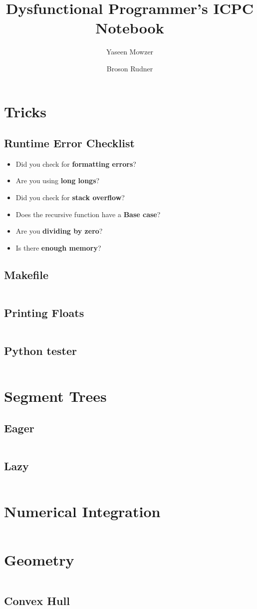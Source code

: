 \documentclass[a4paper]{article}
\title{Dysfunctional Programmer's ICPC Notebook}
\author{Yaseen Mowzer \and Broson Rudner}
\begin{document}
\maketitle
\tableofcontents

\begingroup
\small

\section{Tricks}
\subsection{Runtime Error Checklist}
\begin{itemize}
\item Did you check for \textbf{formatting errors}?
\item Are you using \textbf{long longs}?
\item Did you check for \textbf{stack overflow}?
\item Does the recursive function have a \textbf{Base case}?
\item Are you \textbf{dividing by zero}?
  \item Is there \textbf{enough memory}?
\end{itemize}
\subsection{Makefile}
\inputminted{Make}{Makefile}

\subsection{Printing Floats}
\inputminted{cpp}{abacustricks.cpp}

\subsection{Python tester}

\inputminted{py}{python-check.py}

\section{Segment Trees}
\subsection{Eager}
\inputminted{cpp}{sgt-tree.cpp}
\subsection{Lazy}
\inputminted{cpp}{lazy-sgt-tree.cpp}

\section{Numerical Integration}
\inputminted{cpp}{numerical-integration.cpp}

\section{Geometry}

\inputminted{cpp}{geom.cpp}

\subsection{Convex Hull}

\inputminted{cpp}{convexhull.cpp}

\endgroup
\end{document}
